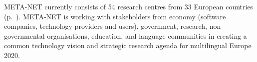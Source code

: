 \begin{Parallel}[c]{78mm}{78mm}
{META-NET currently consists of 54 research centres from 33 European countries (p.~\pageref{metanetmembers}). META-NET is working with stakeholders from economy (software companies, technology providers and users), government, research, non-governmental organisations, education, and language communities in  creating a common technology vision and strategic research agenda for multilingual Europe 2020.

}

\ParallelPar
\end{Parallel}

\cleardoublepage



\tableofcontents


\cleardoublepage


\setcounter{page}{1}
\pagestyle{scrheadings}




